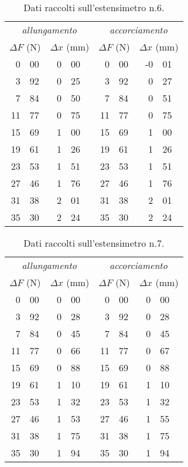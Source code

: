 \begin{table}[hp]\caption{Dati raccolti sull'estensimetro n.6.}\label{tab6}
\centering \small
\begin{tabular}{*4{r@{.}l}}
\multicolumn{4}{c}{\emph{allungamento}} & \multicolumn{4}{c}{\emph{accorciamento}}\\
\multicolumn{2}{c}{$\Delta F$ (\unit{N})}
&\multicolumn{2}{c}{$\Delta x$ (\unit{mm})}
&\multicolumn{2}{c}{$\Delta F$ (\unit{N})}
&\multicolumn{2}{c}{$\Delta x$ (\unit{mm})}\\\hline
0&00 &0&00 &0&00 &-0&01\\
3&92 &0&25 &3&92 &0&27\\
7&84 &0&50 &7&84 &0&51\\
11&77 &0&75 &11&77 &0&75\\
15&69 &1&00 &15&69 &1&00\\
19&61 &1&26 &19&61 &1&26\\
23&53 &1&51 &23&53 &1&51\\
27&46 &1&76 &27&46 &1&76\\
31&38 &2&01 &31&38 &2&01\\
35&30 &2&24 &35&30 &2&24\\
\end{tabular}
\end{table}
\begin{table}[hp]\caption{Dati raccolti sull'estensimetro n.7.}\label{tab7}
\centering \small
\begin{tabular}{*4{r@{.}l}}
\multicolumn{4}{c}{\emph{allungamento}} & \multicolumn{4}{c}{\emph{accorciamento}}\\
\multicolumn{2}{c}{$\Delta F$ (\unit{N})}
&\multicolumn{2}{c}{$\Delta x$ (\unit{mm})}
&\multicolumn{2}{c}{$\Delta F$ (\unit{N})}
&\multicolumn{2}{c}{$\Delta x$ (\unit{mm})}\\\hline
0&00 &0&00 &0&00 &0&00\\
3&92 &0&28 &3&92 &0&28\\
7&84 &0&45 &7&84 &0&45\\
11&77 &0&66 &11&77 &0&67\\
15&69 &0&88 &15&69 &0&88\\
19&61 &1&10 &19&61 &1&10\\
23&53 &1&32 &23&53 &1&32\\
27&46 &1&53 &27&46 &1&55\\
31&38 &1&75 &31&38 &1&75\\
35&30 &1&94 &35&30 &1&94\\
\end{tabular}
\end{table}
